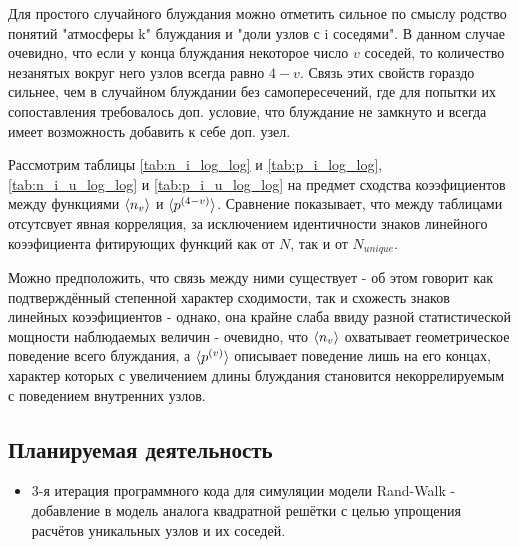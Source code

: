 Для простого случайного блуждания можно отметить сильное по смыслу родство понятий "атмосферы k" блуждания и "доли узлов с i соседями". 
В данном случае очевидно, что если у конца блуждания некоторое число $v$ соседей, то количество незанятых вокруг него узлов всегда равно $4-v$. 
Связь этих свойств гораздо сильнее, чем в случайном блуждании без самопересечений, где для попытки их сопоставления требовалось доп. условие, что блуждание не замкнуто и всегда имеет возможность добавить к себе доп. узел.

Рассмотрим таблицы \ref{tab:n_i_log_log} и \ref{tab:p_i_log_log}, \ref{tab:n_i_u_log_log} и \ref{tab:p_i_u_log_log} на предмет сходства коээфициентов между функциями $\langle n_v \rangle$ и $\langle p^{(4-v)} \rangle$.
Сравнение показывает, что между таблицами отсутсвует явная корреляция, за исключением идентичности знаков линейного коээфициента фитирующих функций как от $N$, так и от $N_{unique}$. 

Можно предположить, что связь между ними существует - об этом говорит как подтверждённый степенной характер сходимости, так и схожесть знаков линейных коээфициентов - однако, она крайне слаба ввиду разной статистической мощности наблюдаемых величин - очевидно, что $\langle n_v \rangle$ охватывает геометрическое поведение всего блуждания, а $\langle p^{(v)} \rangle$ описывает поведение лишь на его концах, характер которых с увеличением длины блуждания становится некоррелируемым с поведением внутренних узлов.

\newpage

\subsection{Планируемая деятельность}

\begin{itemize}
\item 3-я итерация программного кода для симуляции модели Rand-Walk - добавление в модель аналога квадратной решётки с целью упрощения расчётов уникальных узлов и их соседей.
\end{itemize}
